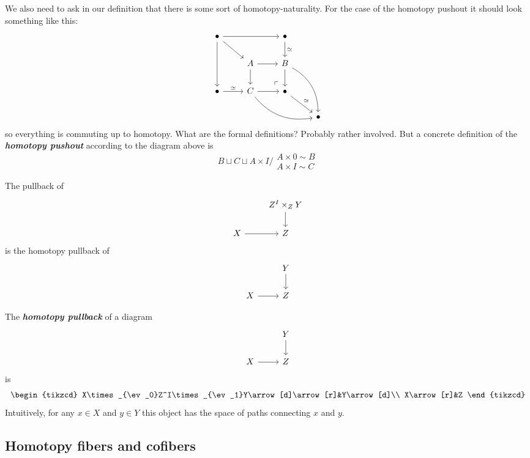 \begin{remark}
\begin{definition}
\begin{definition}
\end{definition}
\begin{remark}
	We also need to ask in our definition that there is some sort of homotopy-naturality. For the case of the homotopy pushout it should look something like this:
		$$\begin{tikzcd}
			\bullet\arrow[rr]\arrow[dd]\arrow[dr]&&\bullet\arrow[d,"\simeq "]\\
			&A\arrow[r]\arrow[d]&B\arrow[d]\arrow[ddr,bend left]\\
			\bullet\arrow[r,"\simeq "]&C\arrow[r]\arrow[drr,bend right]&\bullet\arrow[ul, phantom, "\ulcorner", very near start]\arrow[dr,"\simeq" ]\\
			&&&\bullet
		\end{tikzcd}$$
	so everything is commuting up to homotopy. {\color{magenta}What are the formal definitions? Probably rather involved.} But a concrete definition of the \textit{\textbf{homotopy pushout}} according to the diagram above is
	$$B\sqcup C\sqcup A\times I\Big/\substack{A\times 0\sim B \\ A\times I\sim C}$$
\end{remark}
\begin{remark}
		The pullback of
	$$\begin{tikzcd}
		&Z^I\times_ZY\arrow[d]\\
		X\arrow[r]&Z
	\end{tikzcd}$$
	is the homotopy pullback of
	$$\begin{tikzcd}
		&Y\arrow[d]\\
		X\arrow[r]&Z
	\end{tikzcd}$$
\end{remark}
\begin{definition}
	The \textbf{\textit{homotopy pullback}} of a diagram
		$$\begin{tikzcd}
			&Y\arrow[d]\\
			X\arrow[r]&Z
		\end{tikzcd}$$
		is
		$$\begin{tikzcd}
			X\times_{\ev_0}Z^I\times_{\ev_1}Y\arrow[d]\arrow[r]&Y\arrow[d]\\
			X\arrow[r]&Z
		\end{tikzcd}$$
		Intuitively, for any $x\in X$ and $y\in Y$ this object has the space of paths connecting $x$ and $y$.
\end{definition}

\subsection{Homotopy fibers and cofibers}


\end{definition}
\end{remark}
